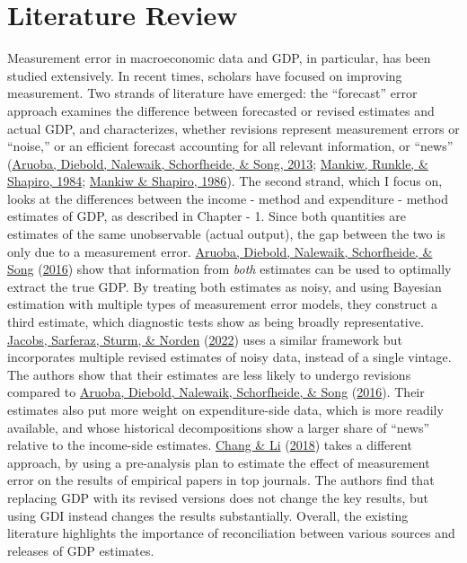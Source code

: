 \documentclass[12pt,nobind, a4paper]{reedthesis}
\begin{document}
 \hypertarget{lit}{%
 \section{Literature Review}\label{lit}}

 Measurement error in macroeconomic data and GDP, in particular, has been studied extensively. In recent times, scholars have focused on improving measurement. Two strands of literature have emerged: the ``forecast'' error approach examines the difference between forecasted or revised estimates and actual GDP, and characterizes, whether revisions represent measurement errors or ``noise,'' or an efficient forecast accounting for all relevant information, or ``news'' (\protect\hyperlink{ref-aruoba_improving_2013}{Aruoba, Diebold, Nalewaik, Schorfheide, \& Song, 2013}; \protect\hyperlink{ref-mankiw_are_1984}{Mankiw, Runkle, \& Shapiro, 1984}; \protect\hyperlink{ref-mankiw_news_1986}{Mankiw \& Shapiro, 1986}). The second strand, which I focus on, looks at the differences between the income - method and expenditure - method estimates of GDP, as described in Chapter - 1. Since both quantities are estimates of the same unobservable (actual output), the gap between the two is only due to a measurement error. \protect\hyperlink{ref-aruoba_improving_2016}{Aruoba, Diebold, Nalewaik, Schorfheide, \& Song} (\protect\hyperlink{ref-aruoba_improving_2016}{2016}) show that information from \emph{both} estimates can be used to optimally extract the true GDP. By treating both estimates as noisy, and using Bayesian estimation with multiple types of measurement error models, they construct a third estimate, which diagnostic tests show as being broadly representative. \protect\hyperlink{ref-jacobs_can_2022}{Jacobs, Sarferaz, Sturm, \& Norden} (\protect\hyperlink{ref-jacobs_can_2022}{2022}) uses a similar framework but incorporates multiple revised estimates of noisy data, instead of a single vintage. The authors show that their estimates are less likely to undergo revisions compared to \protect\hyperlink{ref-aruoba_improving_2016}{Aruoba, Diebold, Nalewaik, Schorfheide, \& Song} (\protect\hyperlink{ref-aruoba_improving_2016}{2016}). Their estimates also put more weight on expenditure-side data, which is more readily available, and whose historical decompositions show a larger share of ``news'' relative to the income-side estimates. \protect\hyperlink{ref-chang_measurement_2018}{Chang \& Li} (\protect\hyperlink{ref-chang_measurement_2018}{2018}) takes a different approach, by using a pre-analysis plan to estimate the effect of measurement error on the results of empirical papers in top journals. The authors find that replacing GDP with its revised versions does not change the key results, but using GDI instead changes the results substantially. Overall, the existing literature highlights the importance of reconciliation between various sources and releases of GDP estimates.
 \linebreak
\end{document}

